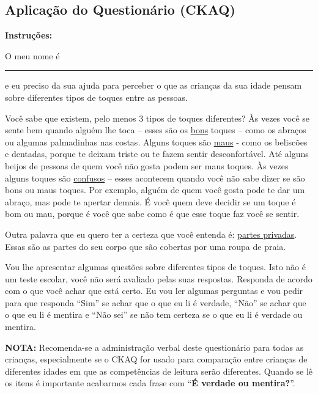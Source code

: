 

\begin{apendicesenv}


\chapter{Aplicação do Questionário (CKAQ)}\label{chap:teste}

\noindent
\textbf{Instruções:}

O meu nome é \rule{3.0cm}{0.15mm} e eu preciso da sua ajuda para perceber o que as crianças da sua idade pensam sobre diferentes tipos de toques entre as pessoas. 

Você sabe que existem, pelo menos 3 tipos de toques diferentes? Às vezes você se sente bem quando alguém lhe toca – esses são os \underline{bons} toques – como os abraços ou algumas palmadinhas nas costas. Alguns toques são \underline{maus} - como os beliscões e dentadas, porque te deixam triste ou te fazem sentir desconfortável. Até alguns beijos de pessoas de quem  você não gosta podem ser maus toques. Às vezes alguns toques são \underline{confusos} – esses acontecem quando você não sabe dizer se são bons ou maus toques. Por exemplo, alguém de quem você gosta pode te dar um abraço, mas pode te apertar demais. É você quem deve decidir se um toque é bom ou mau, porque é você que sabe como é que esse toque faz você se sentir.

Outra palavra que eu quero ter a certeza que você entenda é: \underline{partes privadas}. Essas são as partes do seu corpo que são cobertas por uma roupa de praia. 

Vou lhe apresentar algumas questões sobre diferentes tipos de toques. Isto não é um teste escolar, você não será avaliado pelas suas respostas. Responda de acordo com o que você achar que está certo. Eu vou ler algumas perguntas e vou pedir para que responda “Sim” se achar que o que eu li é verdade, “Não” se achar que o que eu li é mentira e “Não sei” se não tem certeza se o que eu li é verdade ou mentira. 

\vspace{1.0cm}

\noindent
\textbf{NOTA:} Recomenda-se a administração verbal deste questionário para todas as crianças, especialmente se o CKAQ for usado para comparação entre crianças de diferentes idades em que as competências de leitura serão diferentes. Quando se lê os itens é importante acabarmos cada frase com ``\textbf{É verdade ou mentira?}''.


\end{apendicesenv}

